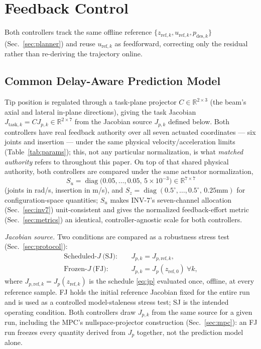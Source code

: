 \documentclass[journal]{IEEEtran}
\begin{document}
\section{Feedback Control}
\label{sec:control}

Both controllers track the same offline reference
$\{z_{\mathrm{ref},k},u_{\mathrm{ref},k},p_{\mathrm{des},k}\}$
(Sec.~\ref{sec:planner}) and reuse $u_{\mathrm{ref},k}$ as feedforward,
correcting only the residual rather than re-deriving the trajectory
online.

\subsection{Common Delay-Aware Prediction Model}
\label{sec:common}

Tip position is regulated through a task-plane projector
$C\in\mathbb{R}^{2\times3}$ (the beam's axial and lateral in-plane
directions), giving the task Jacobian
$J_{\mathrm{task},k}=CJ_{p,k}\in\mathbb{R}^{2\times7}$ from the Jacobian
source $J_{p,k}$ defined below. Both controllers have real feedback
authority over all seven actuated coordinates --- six joints and
insertion --- under the same physical velocity/acceleration limits
(Table~\ref{tab:params}); this, not any particular normalization, is what
\emph{matched authority} refers to throughout this paper. On top of that
shared physical authority, both controllers are compared under the same
actuator normalization,
\begin{equation}
S_u = \operatorname{diag}\big(0.05,\dots,0.05,\,5\times10^{-3}\big)
\in\mathbb{R}^{7\times7}
\label{eq:su}
\end{equation}
(joints in rad/s, insertion in m/s), and
$S_z=\operatorname{diag}(0.5^{\circ},\dots,0.5^{\circ},\,0.25\text{mm})$
for configuration-space quantities; $S_u$ makes INV-7's seven-channel
allocation (Sec.~\ref{sec:inv7}) unit-consistent and gives the normalized
feedback-effort metric (Sec.~\ref{sec:metrics}) an identical,
controller-agnostic scale for both controllers.

\emph{Jacobian source.} Two conditions are compared as a robustness
stress test (Sec.~\ref{sec:protocol}):
\begin{align}
\text{Scheduled-}J\ \text{(SJ)}:&\quad J_{p,k} = J_{p,\mathrm{ref},k},
\label{eq:sj}\\
\text{Frozen-}J\ \text{(FJ)}:&\quad J_{p,k} = J_p(z_{\mathrm{ref},0})\ \forall k,
\label{eq:fj}
\end{align}
where $J_{p,\mathrm{ref},k}=J_p(z_{\mathrm{ref},k})$ is the schedule
\eqref{eq:jp} evaluated once, offline, at every reference sample. FJ holds
the initial reference Jacobian fixed for the entire run and is used as a
controlled model-staleness stress test; SJ is the intended operating
condition. Both controllers draw $J_{p,k}$ from the same source for a
given run, including the MPC's nullspace-projector construction
(Sec.~\ref{sec:mpc}): an FJ run freezes every quantity derived from $J_p$
together, not the prediction model alone.
\end{document}
